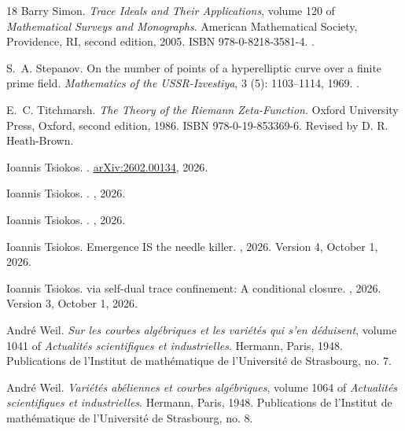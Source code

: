 \documentclass[11pt]{article}
\theoremstyle{definition}
\begin{document}
\begin{thebibliography}{18}
Barry Simon.
\newblock \emph{Trace Ideals and Their Applications}, volume 120 of \emph{Mathematical Surveys and Monographs}.
\newblock American Mathematical Society, Providence, RI, second edition, 2005.
\newblock ISBN 978-0-8218-3581-4.
\newblock {}.

S.~A. Stepanov.
\newblock On the number of points of a hyperelliptic curve over a finite prime field.
\newblock \emph{Mathematics of the USSR-Izvestiya}, 3 (5): 1103--1114, 1969.
\newblock {}.

E.~C. Titchmarsh.
\newblock \emph{The Theory of the {Riemann} Zeta-Function}.
\newblock Oxford University Press, Oxford, second edition, 1986.
\newblock ISBN 978-0-19-853369-6.
\newblock Revised by D. R. Heath-Brown.

Ioannis Tsiokos.
.
\newblock \href{https://arxiv.org/abs/2602.00134}{arXiv:2602.00134}, 2026{}.

Ioannis Tsiokos.
.
\newblock {}, 2026{}.

Ioannis Tsiokos.
.
\newblock {}, 2026{}.

Ioannis Tsiokos.
\newblock Emergence {IS} the needle killer.
\newblock {}, 2026{}.
\newblock Version 4, October 1, 2026.

Ioannis Tsiokos.
 via self-dual trace confinement: A conditional closure.
\newblock {}, 2026{}.
\newblock Version 3, October 1, 2026.

Andr{\'e} Weil.
\newblock \emph{Sur les courbes alg{\'e}briques et les vari{\'e}t{\'e}s qui s'en d{\'e}duisent}, volume 1041 of \emph{Actualit{\'e}s scientifiques et industrielles}.
\newblock Hermann, Paris, 1948{}.
\newblock Publications de l'Institut de math{\'e}matique de l'Universit{\'e} de Strasbourg, no. 7.

Andr{\'e} Weil.
\newblock \emph{Vari{\'e}t{\'e}s ab{\'e}liennes et courbes alg{\'e}briques}, volume 1064 of \emph{Actualit{\'e}s scientifiques et industrielles}.
\newblock Hermann, Paris, 1948{}.
\newblock Publications de l'Institut de math{\'e}matique de l'Universit{\'e} de Strasbourg, no. 8.

\end{thebibliography}
\end{document}
